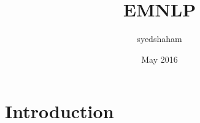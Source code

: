 \documentclass{article}
\title{EMNLP}
\author{syedshaham }
\date{May 2016}
\begin{document}
\maketitle

\section{Introduction}
\end{document}
